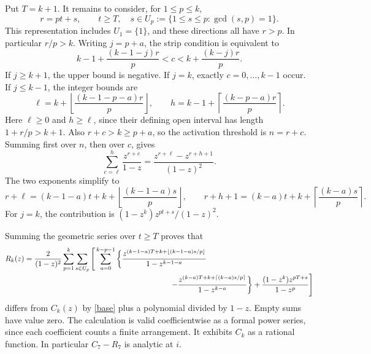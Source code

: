 \documentclass[11pt]{article}
\begin{document}
Put \(T=k+1\). It remains to consider, for \(1\le p\le k\),
\[
 r=pt+s,\qquad t\ge T,\quad
 s\in U_p:=\{1\le s\le p:\gcd(s,p)=1\}.
\]
This representation includes \(U_1=\{1\}\), and these directions all
have \(r>p\). In particular \(r/p>k\).
Writing \(j=p+a\), the strip condition is equivalent to
\begin{equation}\label{cbounds}
 k-1+\frac{(k-1-j)r}{p}<c<
 k+\frac{(k-j)r}{p}.
\end{equation}
If \(j\ge k+1\), the upper bound is negative. If \(j=k\), exactly
\(c=0,\ldots,k-1\) occur. If \(j\le k-1\), the integer bounds are
\[
 \ell=k+\left\lfloor\frac{(k-1-p-a)r}{p}\right\rfloor,
 \qquad
 h=k-1+\left\lceil\frac{(k-p-a)r}{p}\right\rceil .
\]
Here \(\ell\ge0\) and \(h\ge\ell\), since their defining open interval
has length \(1+r/p>k+1\). Also \(r+c>k\ge p+a\), so the activation
threshold is \(n=r+c\).
Summing first over \(n\), then over \(c\), gives
\[
 \sum_{c=\ell}^h\frac{z^{r+c}}{1-z}
 =\frac{z^{r+\ell}-z^{r+h+1}}{(1-z)^2}.
\]
The two exponents simplify to
\[
 r+\ell=(k-1-a)t+k+
 \left\lfloor\frac{(k-1-a)s}{p}\right\rfloor,\qquad
 r+h+1=(k-a)t+k+
 \left\lceil\frac{(k-a)s}{p}\right\rceil .
\]
For \(j=k\), the contribution is
\((1-z^k)z^{pt+s}/(1-z)^2\).

Summing the geometric series over \(t\ge T\) proves that
\begin{equation}\label{tail}
\begin{split}
 R_k(z)=\frac{2}{(1-z)^2}
 \sum_{p=1}^k\sum_{s\in U_p}\Bigg[
 &\sum_{a=0}^{k-p-1}
 \left\{
 \frac{z^{(k-1-a)T+k+\lfloor(k-1-a)s/p\rfloor}}{1-z^{k-1-a}}
 \right.\\[-2pt]
 &\hspace{35mm}\left.
 -\frac{z^{(k-a)T+k+\lceil(k-a)s/p\rceil}}{1-z^{k-a}}
 \right\}
 +\frac{(1-z^k)z^{pT+s}}{1-z^p}
 \Bigg]
\end{split}
\end{equation}
differs from \(C_k(z)\) by \eqref{base} plus a polynomial divided
by \(1-z\). Empty sums have value zero. The calculation is valid
coefficientwise as a formal power series, since each coefficient
counts a finite arrangement. It exhibits \(C_k\) as a rational function.
In particular \(C_7-R_7\) is analytic at \(i\).
\end{document}
